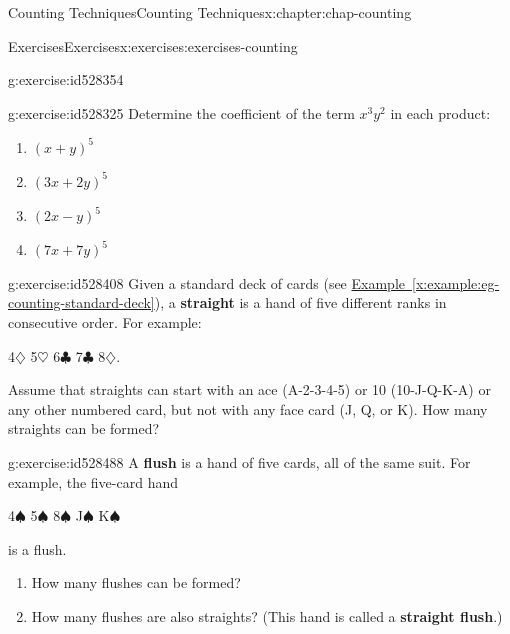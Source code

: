 \documentclass[oneside,10pt,]{book}
\newcommand{\xreffont}{\relax}
\newcommand{\terminology}[1]{\textbf{#1}}
\numberwithin{equation}{section}
\begin{document}
\begin{chapterptx}{Counting Techniques}{}{Counting Techniques}{}{}{x:chapter:chap-counting}
\begin{exercises-section}{Exercises}{}{Exercises}{}{}{x:exercises:exercises-counting}
\begin{divisionexercise}{6}{}{}{g:exercise:id528354}
\end{divisionexercise}%
\begin{divisionexercise}{7}{}{}{g:exercise:id528325}%
Determine the coefficient of the term \(x^3y^2\) in each product:%
\begin{enumerate}[label=(\alph*)]
\item{}\(\displaystyle (x+y)^5\)%
\item{}\(\displaystyle (3x+2y)^5\)%
\item{}\(\displaystyle (2x-y)^5\)%
\item{}\(\displaystyle (7x + 7y)^5\)%
\end{enumerate}
%
\end{divisionexercise}%
\begin{divisionexercise}{8}{}{}{g:exercise:id528408}%
Given a standard deck of cards (see \hyperref[x:example:eg-counting-standard-deck]{Example~{\xreffont\ref{x:example:eg-counting-standard-deck}}}), a \terminology{straight} is a hand of five different ranks in consecutive order. For example:%
\begin{sidebyside}{1}{0.3}{0.3}{0}%
\begin{sbspanel}{0.4}%
4\(\diamondsuit\) 5\(\heartsuit\) 6\(\clubsuit\) 7\(\clubsuit\) 8\(\diamondsuit\).%
\end{sbspanel}%
\end{sidebyside}%
\par
Assume that straights can start with an ace (A-2-3-4-5) or 10 (10-J-Q-K-A) or any other numbered card, but not with any face card (J, Q, or K). How many straights can be formed?%
\end{divisionexercise}%
\begin{divisionexercise}{9}{}{}{g:exercise:id528488}%
A \terminology{flush} is a hand of five cards, all of the same suit. For example, the five-card hand%
\begin{sidebyside}{1}{0.3}{0.3}{0}%
\begin{sbspanel}{0.4}%
4\(\spadesuit\) 5\(\spadesuit\) 8\(\spadesuit\) J\(\spadesuit\) K\(\spadesuit\)%
\end{sbspanel}%
\end{sidebyside}%
\par
is a flush.%
\par
%
\begin{enumerate}[label=(\alph*)]
\item{}How many flushes can be formed?%
\item{}How many flushes are also straights? (This hand is called a \terminology{straight flush}.)%

\end{enumerate}
\end{divisionexercise}
\end{exercises-section}
\end{chapterptx}
\end{document}
